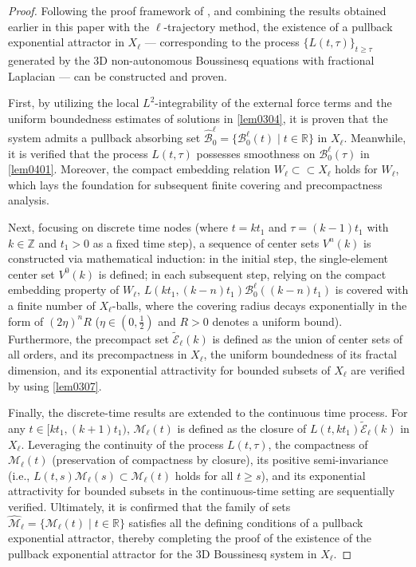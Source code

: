 \documentclass[oneside,preprint,12pt,numbers,sort&compress]{elsarticle}
\begin{document}
\begin{proof}
Following the proof framework of \cite{LY2020,AT2021,YouB2023,YouB2021}, and combining the results obtained earlier in this paper with the $\ell$-trajectory method, the existence of a pullback exponential attractor in \(X_{\ell}\) — corresponding to the process \(\{L(t, \tau)\}_{t \geq \tau}\) generated by the 3D non-autonomous Boussinesq equations with fractional Laplacian — can be constructed and proven.

First, by utilizing the local $L^2$-integrability of the external force terms and the uniform boundedness estimates of solutions in \cref{lem0304}, it is proven that the system admits a pullback absorbing set \(\hat{\mathcal{B}}_0^{\ell} = \{\mathcal{B}_0^{\ell}(t) \mid t \in \mathbb{R}\}\) in \(X_{\ell}\). Meanwhile, it is verified that the process \(L(t, \tau)\) possesses smoothness on \(\mathcal{B}_0^{\ell}(\tau)\) in \cref{lem0401}. Moreover, the compact embedding relation \(W_{\ell} \subset \subset X_{\ell}\) holds for \(W_{\ell}\), which lays the foundation for subsequent finite covering and precompactness analysis.

Next, focusing on discrete time nodes (where \(t = kt_1\) and \(\tau = (k-1)t_1\) with \(k \in \mathbb{Z}\) and \(t_1 > 0\) as a fixed time step), a sequence of center sets \(V^n(k)\) is constructed via mathematical induction: in the initial step, the single-element center set \(V^0(k)\) is defined; in each subsequent step, relying on the compact embedding property of \(W_{\ell}\), \(L(kt_1, (k-n)t_1)\mathcal{B}_0^{\ell}((k-n)t_1)\) is covered with a finite number of \(X_{\ell}\)-balls, where the covering radius decays exponentially in the form of \((2\eta)^n R\) ($\eta \in (0, \frac{1}{2})$ and \(R > 0\) denotes a uniform bound). Furthermore, the precompact set \(\tilde{\mathcal{E}}_{\ell}(k)\) is defined as the union of center sets of all orders, and its precompactness in \(X_{\ell}\), the uniform boundedness of its fractal dimension, and its exponential attractivity for bounded subsets of \(X_{\ell}\) are verified by using \cref{lem0307}.  

Finally, the discrete-time results are extended to the continuous time process. For any \(t \in [kt_1, (k+1)t_1)\), \(\mathcal{M} _{\ell}(t)\) is defined as the closure of \(L(t, kt_1)\tilde{\mathcal{E}}_{\ell}(k)\) in \(X_{\ell}\). Leveraging the continuity of the process \(L(t, \tau)\), the compactness of \( \mathcal{M} _{\ell}(t)\) (preservation of compactness by closure), its positive semi-invariance (i.e., \(L(t, s)\mathcal{M} _{\ell}(s) \subset \mathcal{M} _{\ell}(t)\) holds for all \(t \geq s\)), and its exponential attractivity for bounded subsets in the continuous-time setting are sequentially verified. Ultimately, it is confirmed that the family of sets \(\hat{\mathcal{M} }_{\ell} = \{\mathcal{M} _{\ell}(t) \mid t \in \mathbb{R}\}\) satisfies all the defining conditions of a pullback exponential attractor, thereby completing the proof of the existence of the pullback exponential attractor for the 3D Boussinesq system in \(X_{\ell}\).
\end{proof}
\end{document}
